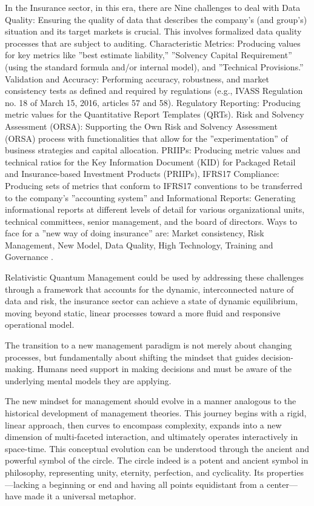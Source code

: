 \documentclass{article}
\begin{document}
In the Insurance sector, in this era, there are Nine challenges to deal with Data Quality: Ensuring the quality of data
that describes the company’s (and group’s) situation and its target markets is crucial. This involves formalized data quality
processes that are subject to auditing. Characteristic Metrics: Producing values for key metrics like ”best estimate liability,”
”Solvency Capital Requirement” (using the standard formula and/or internal model), and ”Technical Provisions.” Validation
and Accuracy: Performing accuracy, robustness, and market consistency tests as defined and required by regulations (e.g.,
IVASS Regulation no. 18 of March 15, 2016, articles 57 and 58). Regulatory Reporting: Producing metric values for the
Quantitative Report Templates (QRTs). Risk and Solvency Assessment (ORSA): Supporting the Own Risk and Solvency
Assessment (ORSA) process with functionalities that allow for the ”experimentation” of business strategies and capital
allocation. PRIIPs: Producing metric values and technical ratios for the Key Information Document (KID) for Packaged
Retail and Insurance-based Investment Products (PRIIPs), IFRS17 Compliance: Producing sets of metrics that conform
to IFRS17 conventions to be transferred to the company’s ”accounting system” and Informational Reports: Generating
informational reports at different levels of detail for various organizational units, technical committees, senior management,
and the board of directors. Ways to face for a ”new way of doing insurance” are: Market consistency, Risk Management,
New Model, Data Quality, High Technology, Training and Governance \cite{sfide9}.

Relativistic Quantum Management could be used by addressing these challenges through a framework that accounts for the dynamic, interconnected nature of data and risk, the insurance sector can achieve a state of dynamic equilibrium, moving beyond static, linear processes toward a more fluid and responsive operational model.

The transition to a new management paradigm is not merely about changing processes, but fundamentally about shifting the mindset that guides decision-making. Humans need support in making decisions and must be aware of the underlying mental models they are applying.

The new mindset for management should evolve in a manner analogous to the historical development of management theories. This journey begins with a rigid, linear approach, then curves to encompass complexity, expands into a new dimension of multi-faceted interaction, and ultimately operates interactively in space-time. This conceptual evolution can be understood through the ancient and powerful symbol of the circle. The circle indeed is a potent and ancient symbol in philosophy, representing unity, eternity, perfection, and cyclicality. Its properties—lacking a beginning or end and having all points equidistant from a center—have made it a universal metaphor.
\end{document}
